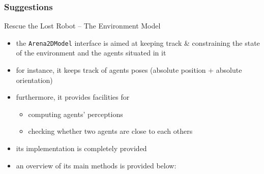 \documentclass[presentation]{beamer}\mode<presentation>{\usetheme{AMSBolognaFC}}
\begin{document}
\subsubsection{Suggestions}

\begin{frame}[c, allowframebreaks]{Rescue the Lost Robot -- The Environment Model}
    \begin{itemize}
        \item the \texttt{\alert{Arena2DModel}} interface is aimed at keeping track \& constraining the state of the environment and the agents situated in it
        
        \vspace{.3cm}

        \item for instance, it keeps track of agents poses (absolute position + absolute orientation)
        
        \vspace{.3cm}
        
        \item furthermore, it provides facilities for 
        \begin{itemize}
            \item computing agents' perceptions
            \item checking whether two agents are close to each others
        \end{itemize}
    
        \vspace{.3cm}
        
        \item its implementation is completely provided
        
        \framebreak
        
        \item an overview of its main methods is provided below:
        
    
    \end{itemize}

\end{frame} 
\end{document}
